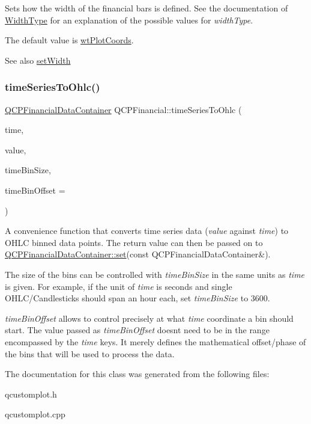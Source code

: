 Sets how the width of the financial bars is defined. See the documentation of \hyperlink{class_q_c_p_financial_aef1761dda71a53dc5269685e9e492626}{Width\+Type} for an explanation of the possible values for {\itshape width\+Type}.

The default value is \hyperlink{class_q_c_p_financial_aef1761dda71a53dc5269685e9e492626af676bc8dbe700b96b333329c9dbfc30f}{wt\+Plot\+Coords}.

\begin{DoxySeeAlso}{See also}
\hyperlink{class_q_c_p_financial_a99633f8bac86a61d534ae5eeb1a3068f}{set\+Width} 
\end{DoxySeeAlso}
\mbox{\label{class_q_c_p_financial_a9a058c035040d3939b8884f4aaccb1a7}} 
\subsubsection{\texorpdfstring{time\+Series\+To\+Ohlc()}{timeSeriesToOhlc()}}
{\footnotesize\ttfamily \hyperlink{class_q_c_p_data_container}{Q\+C\+P\+Financial\+Data\+Container} Q\+C\+P\+Financial\+::time\+Series\+To\+Ohlc (\begin{DoxyParamCaption}\item[{const Q\+Vector$<$ double $>$ \&}]{time,  }\item[{const Q\+Vector$<$ double $>$ \&}]{value,  }\item[{double}]{time\+Bin\+Size,  }\item[{double}]{time\+Bin\+Offset = {} }\end{DoxyParamCaption})\hspace{0.3cm}{\ttfamily [static]}}

A convenience function that converts time series data ({\itshape value} against {\itshape time}) to O\+H\+LC binned data points. The return value can then be passed on to \hyperlink{class_q_c_p_data_container_ae7042bd534fc3ce7befa2ce3f790b5bf}{Q\+C\+P\+Financial\+Data\+Container\+::set}(const Q\+C\+P\+Financial\+Data\+Container\&).

The size of the bins can be controlled with {\itshape time\+Bin\+Size} in the same units as {\itshape time} is given. For example, if the unit of {\itshape time} is seconds and single O\+H\+L\+C/\+Candlesticks should span an hour each, set {\itshape time\+Bin\+Size} to 3600.

{\itshape time\+Bin\+Offset} allows to control precisely at what {\itshape time} coordinate a bin should start. The value passed as {\itshape time\+Bin\+Offset} doesn\textquotesingle{}t need to be in the range encompassed by the {\itshape time} keys. It merely defines the mathematical offset/phase of the bins that will be used to process the data. 

The documentation for this class was generated from the following files\+:\begin{DoxyCompactItemize}
\item 
qcustomplot.\+h\item 
qcustomplot.\+cpp\end{DoxyCompactItemize}
